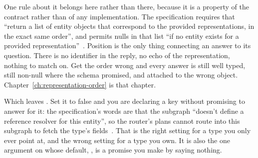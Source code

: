 %
One rule about it belongs here rather than there, because it is a property of
the contract rather than of any implementation. The specification requires that
 \enquote{return a list of entity objects that correspond to
the provided representations, in the exact same order}, and permits nulls in
that list \enquote{if no entity exists for a provided
representation}~\autocite{apollosubgraphspec}. Position is the only thing
connecting an answer to its question. There is no identifier in the reply, no
echo of the representation, nothing to match on. Get the order wrong and every
answer is still well typed, still non-null where the schema promised, and
attached to the wrong object. Chapter~\ref{ch:representation-order} is that
chapter.

%
Which leaves . Set it to false and you are declaring a key
without promising to answer for it: the specification's words are that the
subgraph \enquote{doesn't define a reference resolver for this entity}, so the
router's plans cannot route into this subgraph to fetch the type's
fields~\autocite{apollodirectives}. That is the right setting for a type you
only ever point at, and the wrong setting for a type you own. It is also the
one argument on  whose default, , is a promise you make
by saying nothing.
%
